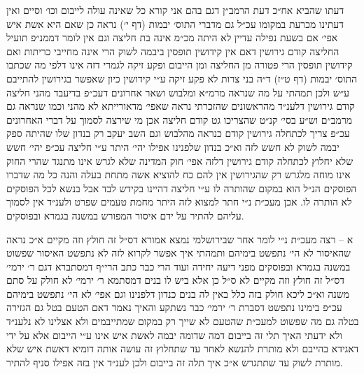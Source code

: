 \documentclass[12pt, openany]{book}
\begin{document}
\begin{multicols}{2}
דעתו שהביא אח״כ דעת הרמב״ן דגם בהם אני קורא כל שאינה עולה לייבום וכו׳ וסיים ואין דעתינו מכרעת במקומו עכ״ל גם מדברי התוס׳ יבמות (דף י׳) נראה כן שאם היא אשת איש אפי׳ אם בשעת נפילה עדיין לא היתה מכ״מ אינה בת חליצה וגם אין לומר דממנ״פ תועיל החליצה קודם גירושין דאם אין קידושין תופסין ביבמה לשוק הרי אינה מחייבי כריתות ואם קידושין תופסין הרי פטורה מן החליצה ומן הייבום ופקע זיקה לגמרי דזה אינו דלפי מה שכתבו התוס׳ יבמות (דף ט״ז) ד״ה בני צרות לא פקע זיקה ע״י קידושין כיון שאפשר בגירושין להתייבם ע״ש ולכן תמהתי על מה שנראה מרמ״א ומלבוש ושאר אחרונים דעכ״פ בדיעבד מהני חליצה קודם גירושין דלענ״ד מהראשונים שהזכרתי נראה שאפי׳ מדאורייתא לא מהני וכמו שנראה גם מרמב״ם וש״ע בסי׳ קנ״ט שהצריכו גט קודם חליצה אכן מי שירצה לסמוך על דברי האחרונים עכ״פ צריך לכתחלה גירושין קודם כנראה מהלבוש וגם השב יעקב רק בנדון שלו שהיתה ספק יבמה לשוק לא חשש לזה וא״כ בנדון שלפנינו אפילו יהי׳ היתר ע״י חליצה עכ״פ יהי׳ חשש שלא יחלוץ לכתחלה קודם גירושין דלזה אפי׳ חוק המדינה שלא לגרש אינו מתנגד שהרי החוק אינו מוחה מלגרש רק שהגירושין אין להם כח להוציא אשה מתחת בעלה והנה כל מה שדברו הפוסקים הנ״ל הוא במקום שהותרה לו ע״י חליצה דהיינו בקידש לבד אבל בנשא לכל הפוסקים לא הותרה לו. אכן מעכ״ת נ״י חתר למצוא לזה היתר מחמת טעמים שפרט ולענ״ד אין לסמוך עליהם להתיר על ידם איסור המפורש במשנה בגמרא ובפוסקים.\\\vspace{0pt}

א – רצה מעכ״ת נ״י לומר אחר שבירושלמי נמצא אמורא דס״ל זה חולץ וזה מקיים א״כ נראה שהאיסור לא הי׳ נתפשט בימיהם ותמהתי איך אפשר לקרוא לזה לא נתפשט האיסור שפשוט במשנה בגמרא ובפוסקים מפני דיעה יחידה ועוד הרי כבר כתב הרי״ף דמסתברא דגם ר׳ ירמי׳ דס״ל זה חולץ וזה מקיים לא ס״ל כן אלא ביש לו בנים דמסתמא ר׳ ירמי׳ לא חולק על סתם משנה וא״כ ליכא חולק בזה כלל באין לה בנים כנדון דלפנינו וגם אפי׳ לא הי׳ נתפשט בימיהם עכ״פ בימינו נתפשט דסברת ר׳ ירמי׳ כבר נשתקע והאיך נאמר דאם הטעם בטל גם הגזירה בטלה גם מה שפשוט למעכ״ת שהטעם לא שייך רק במקום שמתייבמים ולא אצלינו לא נלענ״ד ולא ידעתי האיך תלי זה בייבום דמה שדומה יבמה לאשת איש אינו ע״י הייבום אלא על ידי דאגידא בהייבם ולא מותרת להנשא לאחר עד שתחלוץ זה עושה אותה דומיא דאשת איש שלא מותרת לשוק עד שתתגרש א״כ איך תלה זה בייבום ולכן לענ״ד אין בזה אפילו סניף להתיר.\\\vspace{0pt}


\end{multicols}
\end{document}
